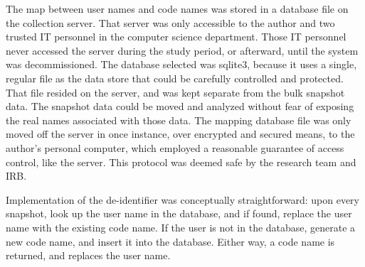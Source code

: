 The map between user names and code names was stored in a database file on the collection server. That server was only accessible to the author and two trusted IT personnel in the computer science department. Those IT personnel never accessed the server during the study period, or afterward, until the system was decommissioned. The database selected was sqlite3, because it uses a single, regular file as the data store that could be carefully controlled and protected. That file resided on the server, and was kept separate from the bulk snapshot data. The snapshot data could be moved and analyzed without fear of exposing the real names associated with those data. The mapping database file was only moved off the server in once instance, over encrypted and secured means, to the author's personal computer, which employed a reasonable guarantee of access control, like the server. This protocol was deemed safe by the research team and IRB.

Implementation of the de-identifier was conceptually straightforward: upon every snapshot, look up the user name in the database, and if found, replace the user name with the existing code name. If the user is not in the database, generate a new code name, and insert it into the database. Either way, a code name is returned, and replaces the user name. 




